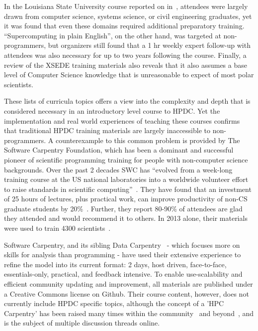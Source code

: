 \documentclass[conference]{IEEEtran}
\begin{document}
In the Louisiana State University course reported on in~\cite{Allen2011-qx}, attendees were largely drawn from computer science, systems science, or civil engineering graduates, yet it was found that even these domains required additional preparatory training. ``Supercomputing in plain English'', on the other hand, was targeted at non-programmers, but organizers still found that a 1 hr weekly expert follow-up with attendees was also necessary for up to two years following the course.  Finally, a review of the XSEDE training materials also reveals that it also assumes a base level of Computer Science knowledge that is unreasonable to expect of most polar scientists.

These lists of curricula topics offers a view into the complexity and depth that is considered necessary in an introductory level course to HPDC. Yet the implementation and real world experiences of teaching these courses confirms that traditional HPDC training materials are largely inaccessible to non-programmers. A counterexample to this common problem is provided by The Software Carpentry Foundation, which has been a dominant and successful pioneer of scientific programming training for people with non-computer science backgrounds. Over the past 2 decades SWC has ``evolved from a week-long training course at the US national laboratories into a worldwide volunteer effort to raise standards in scientific computing''~\cite{Wilson2014-pc}. They have found that an investment of 25 hours of lectures, plus practical work, can improve productivity of non-CS graduate students by 20\%~\cite{Wilson_undated-yk}. Further, they report 80-90\% of attendees are glad they attended and would recommend it to others. In 2013 alone, their materials were used to train 4300 scientists~\cite{Wilson2014-pc}.

Software Carpentry, and its sibling Data Carpentry~\cite{Mimno2016-cw} - which focuses more on skills for analysis than programming - have used their extensive experience to refine the model into its current format: 2 days, host driven, face-to-face, essentials-only, practical, and feedback intensive. To enable use-scalability and efficient community updating and improvement, all materials are published under a Creative Commons license on Github. Their course content, however, does not currently include HPDC specific topics, although the concept of a 'HPC Carpentry' has been raised many times within the community~\cite{Datacarpentry_undated-zl} and beyond~\cite{noauthor_undated-zw}, and is the subject of multiple discussion threads online. 
\end{document}
